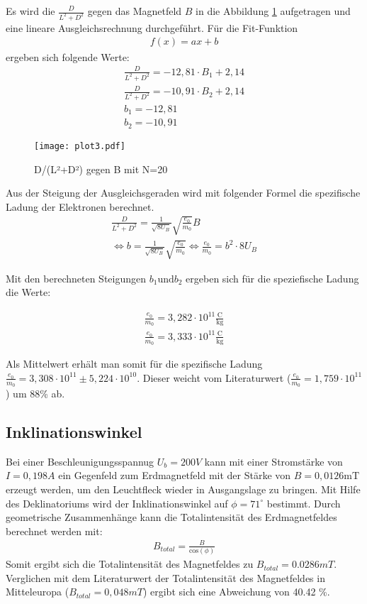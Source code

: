 \noindent

Es wird die $\frac{D}{L^2 + D^2}$ gegen das Magnetfeld $B$ in die Abbildung \ref{fig:plot3} aufgetragen und eine lineare Ausgleichsrechnung durchgeführt.
Für die Fit-Funktion
\begin{align*}
  f(x)=ax+b
\end{align*}
\noindent 
ergeben sich folgende Werte:
\begin{align*}
  \frac{D}{L^2 +D^2} = -12,81 \cdot B_1 + 2,14 \\
  \frac{D}{L^2 +D^2} = -10,91 \cdot B_2 + 2,14 \\
  b_1 = -12,81 \\
  b_2 = -10,91
\end{align*}
\noindent 

\FloatBarrier
\begin{figure}
  \centering
  \texttt{[image: plot3.pdf]}
  \caption{D/(L²+D²) gegen B mit N=20}
  \label{fig:plot3}
\end{figure}
\noindent 

Aus der Steigung der Ausgleichsgeraden wird mit folgender Formel die spezifische Ladung der Elektronen berechnet.
\begin{align*}
  \frac{D}{L^2+D^2} = \frac{1}{\sqrt{8 U_B}} \sqrt{\frac{e_0}{m_0}} B \\
  \Leftrightarrow b = \frac{1}{\sqrt{8 U_B}}\sqrt{\frac{e_0}{m_0}}
  \Leftrightarrow \frac{e_0}{m_0} = b^2 \cdot 8 U_B
\end{align*}
\noindent 

Mit den berechneten Steigungen $b_1 \text{und} b_2$ ergeben sich für die speziefische Ladung die Werte:

\begin{align*}
  \frac{e_0}{m_0} = 3,282 \cdot 10^11 \frac{\text{C}}{\text{kg}} \\
  \frac{e_0}{m_0} = 3,333 \cdot 10^11 \frac{\text{C}}{\text{kg}}
\end{align*}
\noindent 

Als Mittelwert erhält man somit für die spezifische Ladung $\frac{e_0}{m_0} = 3,308 \cdot 10^11 \pm 5,224 \cdot 10^10 $.
Dieser weicht vom Literaturwert ($\frac{e_0}{m_0} = 1,759 \cdot 10^{11}$) um  88\% ab.

\subsection{Inklinationswinkel}
\label{inklination}

Bei einer Beschleunigungsspannug $U_b = 200V$ kann mit einer Stromstärke von $I = 0,198 A$ ein Gegenfeld zum Erdmagnetfeld mit der Stärke von $B = 0,0126 \text{mT}$ erzeugt werden, um den Leuchtfleck wieder in Ausgangslage zu bringen.
Mit Hilfe des Deklinatoriums wird der Inklinationswinkel auf $\phi = 71^\circ$ bestimmt.
Durch geometrische Zusammenhänge kann die Totalintensität des Erdmagnetfeldes berechnet werden mit:
\begin{align*}
  B_{total} = \frac{B}{\text{cos}(\phi)}
\end{align*}
\noindent 
Somit ergibt sich die Totalintensität des Magnetfeldes zu $B_{total} = 0.0286 mT$.
Verglichen mit dem Literaturwert der Totalintensität des Magnetfeldes in Mitteleuropa ($B_{total} = 0,048 mT$) ergibt sich eine Abweichung von 40.42 \%.
